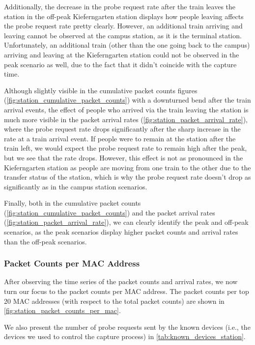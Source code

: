 \documentclass[sigconf,nonacm]{acmart}
\begin{document}
Additionally, the decrease in the probe request rate after the train leaves the station in the off-peak Kieferngarten station displays how people leaving affects the probe request rate pretty clearly. However, an additional train arriving and leaving cannot be observed at the campus station, as it is the terminal station. Unfortunately, an additional train (other than the one going back to the campus) arriving and leaving at the Kieferngarten station could not be observed in the peak scenario as well, due to the fact that it didn't coincide with the capture time.

Although slightly visible in the cumulative packet counts figures (\cref{fig:station_cumulative_packet_counts}) with a downturned bend after the train arrival events, the effect of people who arrived via the train leaving the station is much more visible in the packet arrival rates (\cref{fig:station_packet_arrival_rate}), where the probe request rate drops significantly after the sharp increase in the rate at a train arrival event. If people were to remain at the station after the train left, we would expect the probe request rate to remain high after the peak, but we see that the rate drops. However, this effect is not as pronounced in the Kieferngarten station as people are moving from one train to the other due to the transfer status of the station, which is why the probe request rate doesn't drop as significantly as in the campus station scenarios.

Finally, both in the cumulative packet counts (\cref{fig:station_cumulative_packet_counts}) and the packet arrival rates (\cref{fig:station_packet_arrival_rate}), we can clearly identify the peak and off-peak scenarios, as the peak scenarios display higher packet counts and arrival rates than the off-peak scenarios.

\subsubsection{Packet Counts per MAC Address}
\label{sec:part-1/station/packet-counts-per-mac}

After observing the time series of the packet counts and arrival rates, we now turn our focus to the packet counts per MAC address. The packet counts per top 20 MAC addresses (with respect to the total packet counts) are shown in \cref{fig:station_packet_counts_per_mac}.

We also present the number of probe requests sent by the known devices (i.e., the devices we used to control the capture process) in \cref{tab:known_devices_station}.
\end{document}
